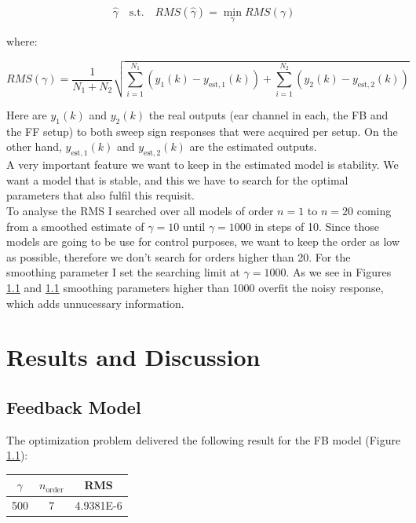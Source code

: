 \[\hat{\gamma} \quad\text{s.t.}\quad RMS(\hat{\gamma}) = \min\limits_\gamma RMS(\gamma)\]

where:

\[RMS(\gamma) = \frac{1}{N_1 + N_2} \sqrt{\sum\limits_{i=1}^{N_1}(y_1(k)-y_{\text{est},1}(k))+\sum\limits_{i=1}^{N_2}(y_2(k)-y_{\text{est},2}(k))}\]

Here are $y_1(k)$ and $y_2(k)$ the real outputs (ear channel in each, the FB and the FF setup) to both sweep sign responses that were acquired per setup. On the other hand, $y_{\text{est},1}(k)$ and $y_{\text{est},2}(k)$ are the estimated outputs.\\

A very important feature we want to keep in the estimated model is stability. We want a model that is stable, and this we have to search for the optimal parameters that also fulfil this requisit.\\

To analyse the RMS I searched over all models of order $n=1$ to $n = 20$ coming from a smoothed estimate of $\gamma = 10$ until $\gamma = 1000$ in steps of 10. Since those models are going to be use for control purposes, we want to keep the order as low as possible, therefore we don't search for orders higher than 20. For the smoothing parameter I set the searching limit at $\gamma = 1000$. As we see in Figures \ref{} and \ref{} smoothing parameters higher than 1000 overfit the noisy response, which adds unnucessary information. \\



\chapter{Results and Discussion}

\section{Feedback Model}
The optimization problem delivered the following result for the FB model (Figure \ref{}):

\begin{table}[H]
\centering
\begin{tabular}{c|c|c}
$\gamma$ & $n_\text{order}$ & RMS \\ \hline
500 & 7 & 4.9381E-6 \\ 
\end{tabular}
\end{table}

